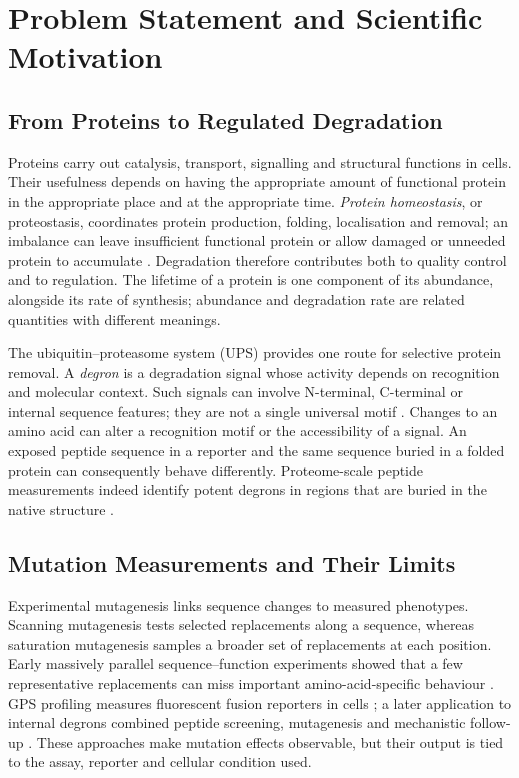 \label{chap:introduction}
\ThesisFlatNumbering

\section{Problem Statement and Scientific Motivation}
\subsection{From Proteins to Regulated Degradation}
Proteins carry out catalysis, transport, signalling and structural functions in cells. Their usefulness
depends on having the appropriate amount of functional protein in the appropriate place and at the
appropriate time. \emph{Protein homeostasis}, or proteostasis, coordinates protein production, folding,
localisation and removal; an imbalance can leave insufficient functional protein or allow damaged or
unneeded protein to accumulate \citep{balch2008}. Degradation therefore contributes both to quality
control and to regulation. The lifetime of a protein is one component of its abundance, alongside its
rate of synthesis; abundance and degradation rate are related quantities with different meanings.

The ubiquitin--proteasome system (UPS) provides one route for selective protein removal. A
\emph{degron} is a degradation signal whose activity depends on recognition and molecular context.
Such signals can involve N-terminal, C-terminal or internal sequence features; they are not a single
universal motif \citep{varshavsky2019,koren2018}. Changes to an amino acid can alter a recognition
motif or the accessibility of a signal. An exposed peptide sequence in a reporter and the same sequence
buried in a folded protein can consequently behave differently. Proteome-scale peptide measurements
indeed identify potent degrons in regions that are buried in the native structure \citep{voutsinos2026}.

\subsection{Mutation Measurements and Their Limits}
Experimental mutagenesis links sequence changes to measured phenotypes. Scanning mutagenesis tests
selected replacements along a sequence, whereas saturation mutagenesis samples a broader set of
replacements at each position. Early massively parallel sequence--function experiments showed that a
few representative replacements can miss important amino-acid-specific behaviour \citep{fowler2010}.
GPS profiling measures fluorescent fusion reporters in cells \citep{yen2008}; a later application to
internal degrons combined peptide screening, mutagenesis and mechanistic follow-up
\citep{zhang2023}. These approaches make mutation effects observable, but their output is tied to the
assay, reporter and cellular condition used.

